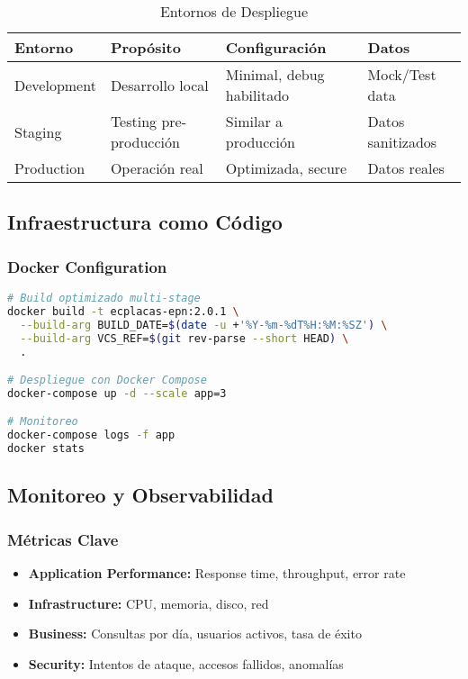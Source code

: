 \documentclass[12pt,a4paper]{article}
\begin{document}
\begin{table}[h]
\centering
\begin{tabularx}{\textwidth}{|l|X|X|X|}
\hline
\textbf{Entorno} & \textbf{Propósito} & \textbf{Configuración} & \textbf{Datos} \\
\hline
Development & Desarrollo local & Minimal, debug habilitado & Mock/Test data \\
\hline
Staging & Testing pre-producción & Similar a producción & Datos sanitizados \\
\hline
Production & Operación real & Optimizada, secure & Datos reales \\
\hline
\end{tabularx}
\caption{Entornos de Despliegue}
\end{table}

\subsection{Infraestructura como Código}

\subsubsection{Docker Configuration}

\begin{lstlisting}[language=bash]
# Build optimizado multi-stage
docker build -t ecplacas-epn:2.0.1 \
  --build-arg BUILD_DATE=$(date -u +'%Y-%m-%dT%H:%M:%SZ') \
  --build-arg VCS_REF=$(git rev-parse --short HEAD) \
  .

# Despliegue con Docker Compose
docker-compose up -d --scale app=3

# Monitoreo
docker-compose logs -f app
docker stats
\end{lstlisting}

\subsection{Monitoreo y Observabilidad}

\subsubsection{Métricas Clave}

\begin{itemize}
    \item \textbf{Application Performance:} Response time, throughput, error rate
    \item \textbf{Infrastructure:} CPU, memoria, disco, red
    \item \textbf{Business:} Consultas por día, usuarios activos, tasa de éxito
    \item \textbf{Security:} Intentos de ataque, accesos fallidos, anomalías
\end{itemize}
\end{document}
